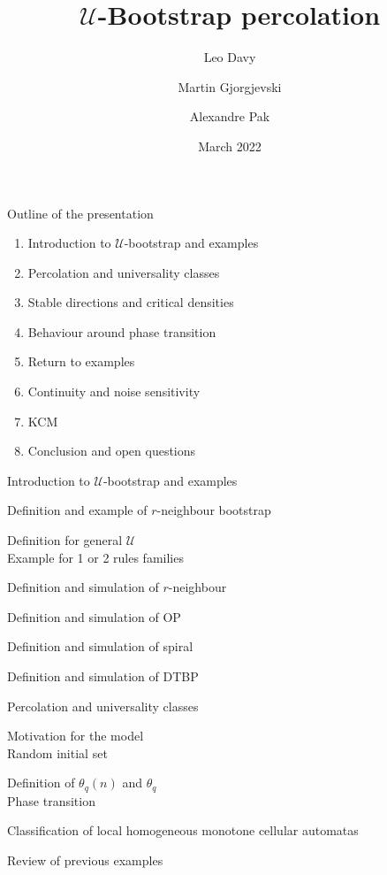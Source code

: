 \documentclass{beamer}
\title[title] %
{$\mathcal{U}$-Bootstrap percolation}
\author[Davy, Gjorgjevski, Pak] %
{Leo Davy \and Martin Gjorgjevski \and Alexandre Pak}
\institute[ENS Lyon] %
{
  ENS Lyon \\
  M2 Advanced Mathematics}
\date[Short Occasion] %
{March 2022}
\begin{document}
\maketitle
\begin{frame}{Outline of the presentation}
	\begin{enumerate}
		\item Introduction to $\mathcal{U}$-bootstrap and examples
		\item Percolation and universality classes 
		\item Stable directions and critical densities
		\item Behaviour around phase transition
		\item Return to examples
		\item Continuity and noise sensitivity
		\item KCM
		\item Conclusion and open questions
	\end{enumerate}
\end{frame}
\begin{section}{ Introduction to $\mathcal{U}$-bootstrap and examples}
	\begin{frame}
		Definition and example of $r$-neighbour bootstrap
	\end{frame}
	\begin{frame}
		Definition for general $\mathcal{U}$\\
		Example for 1 or 2 rules families
	\end{frame}
	\begin{frame}
		Definition and simulation of $r$-neighbour
	\end{frame}
	\begin{frame}
		Definition and simulation of OP
	\end{frame}
	\begin{frame}
		Definition and simulation of spiral
	\end{frame}
	\begin{frame}
		Definition and simulation of DTBP
	\end{frame}
\end{section}
\begin{section}{Percolation and universality classes}
	\begin{frame}
		Motivation for the model \\
		Random initial set
	\end{frame}
	\begin{frame}
		Definition of $\theta_q(n)$ and $\theta_q$ \\
		Phase transition
	\end{frame}
	\begin{frame}
		Classification of local homogeneous monotone cellular automatas
	\end{frame}
	\begin{frame}
		Review of previous examples
	\end{frame}
\end{section}
\end{document}
